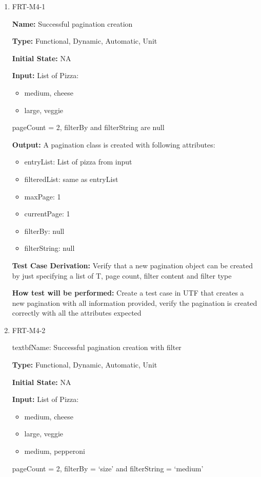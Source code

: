 \documentclass[12pt, titlepage]{article}
\begin{document}
\begin{enumerate}
\item{FRT-M4-1}

\textbf{Name:} Successful pagination creation

\textbf{Type:} Functional, Dynamic, Automatic, Unit
					
\textbf{Initial State:} NA
					
\textbf{Input:} List of Pizza:
\begin{itemize}
\item medium, cheese
\item large, veggie
\end{itemize}
pageCount = 2, filterBy and filterString are null
					
\textbf{Output:} A pagination class is created with following attributes:
\begin{itemize}
\item entryList: List of pizza from input
\item filteredList: same as entryList
\item maxPage: 1
\item currentPage: 1
\item filterBy: null
\item filterString: null
\end{itemize}

\textbf{Test Case Derivation:} Verify that a new pagination object can be created by just specifying a list of T, page count, filter content and filter type

\textbf{How test will be performed:} Create a test case in UTF that creates a new pagination with all information provided, verify the pagination is created correctly with all the attributes expected

\item{FRT-M4-2}

textbf{Name:} Successful pagination creation with filter 

\textbf{Type:} Functional, Dynamic, Automatic, Unit
					
\textbf{Initial State:} NA
					
\textbf{Input:} List of Pizza:
\begin{itemize}
\item medium, cheese
\item large, veggie
\item medium, pepperoni
\end{itemize}
pageCount = 2, filterBy = `size' and filterString = `medium'
					

\end{enumerate}
\end{document}
